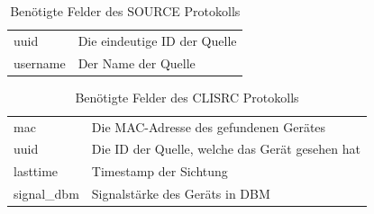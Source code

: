 \documentclass[a4paper]{spie}  %
\begin{document}
\begin{table}[!h]
	\centering
	\begin{tabular}{ | p{} | p{} | }
		\hline 
		\rowcolor{blau} \multicolumn{2}{l|}{\textcolor{white}{\textbf{SOURCE}}}  \\ \hline
		uuid & Die eindeutige ID der Quelle \\ \hline
		username & Der Name der Quelle \\
		\hline
	\end{tabular}
	\caption{Benötigte Felder des SOURCE Protokolls}
	\label{tab:src}
\end{table}

\begin{table}[!h]
	\centering
	\begin{tabular}{ | p{} | p{} | }
		\hline
		\rowcolor{blau} \multicolumn{2}{l|}{\textcolor{white}{\textbf{CLISRC}}}  \\ \hline
		mac & Die MAC-Adresse des gefundenen Gerätes \\ \hline
		uuid & Die ID der Quelle, welche das Gerät gesehen hat \\ \hline
		lasttime & Timestamp der Sichtung \\ \hline
		signal\_dbm & Signalstärke des Geräts in DBM \\
		\hline
	\end{tabular}
	\caption{Benötigte Felder des CLISRC Protokolls}
	\label{tab:cli}
\end{table}
\end{document}
